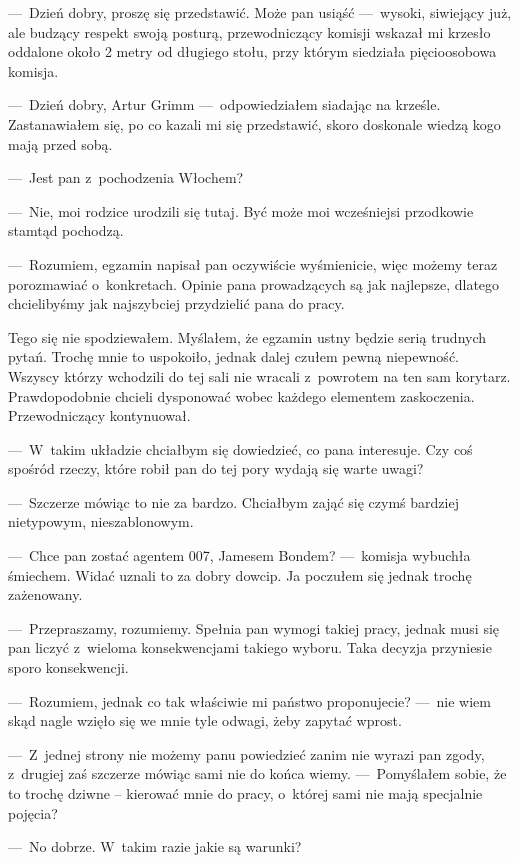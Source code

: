 ---~Dzień dobry, proszę się przedstawić. Może pan usiąść ---~wysoki, siwiejący już, ale budzący respekt swoją posturą, przewodniczący komisji wskazał mi krzesło oddalone około 2 metry od długiego stołu, przy którym siedziała pięcioosobowa komisja. 

---~Dzień dobry, Artur Grimm ---~odpowiedziałem siadając na krześle. Zastanawiałem się, po co kazali mi się przedstawić, skoro doskonale wiedzą kogo mają przed sobą. 

---~Jest pan z~pochodzenia Włochem? 

---~Nie, moi rodzice urodzili się tutaj. Być może moi wcześniejsi przodkowie stamtąd pochodzą. 

---~Rozumiem, egzamin napisał pan oczywiście wyśmienicie, więc możemy teraz porozmawiać o~konkretach. Opinie pana prowadzących są jak najlepsze, dlatego chcielibyśmy jak najszybciej przydzielić pana do pracy.

Tego się nie spodziewałem. Myślałem, że egzamin ustny będzie serią trudnych pytań. Trochę mnie to uspokoiło, jednak dalej czułem pewną niepewność. Wszyscy którzy wchodzili do tej sali nie wracali z~powrotem  na ten sam korytarz. Prawdopodobnie chcieli dysponować wobec każdego elementem zaskoczenia. Przewodniczący kontynuował. 

---~W~takim układzie chciałbym się dowiedzieć, co pana interesuje. Czy coś spośród rzeczy, które robił pan do tej pory wydają się warte uwagi? 

---~Szczerze mówiąc to nie za bardzo. Chciałbym zająć się czymś bardziej nietypowym, nieszablonowym. 

---~Chce pan zostać agentem 007, Jamesem Bondem? ---~komisja wybuchła śmiechem. Widać uznali to za dobry dowcip. Ja poczułem się jednak trochę zażenowany. 

---~Przepraszamy, rozumiemy. Spełnia pan wymogi takiej pracy, jednak musi się pan liczyć z~wieloma konsekwencjami takiego wyboru. Taka decyzja przyniesie sporo konsekwencji. 

---~Rozumiem, jednak co tak właściwie mi państwo proponujecie? ---~nie wiem skąd nagle wzięło się we mnie tyle odwagi, żeby zapytać wprost. 

---~Z~jednej strony nie możemy panu powiedzieć zanim nie wyrazi pan zgody, z~drugiej zaś szczerze mówiąc sami nie do końca wiemy. ---~Pomyślałem sobie, że to trochę dziwne -- kierować mnie do pracy, o~której sami nie mają specjalnie pojęcia? 

---~No dobrze. W~takim razie jakie są warunki? 

